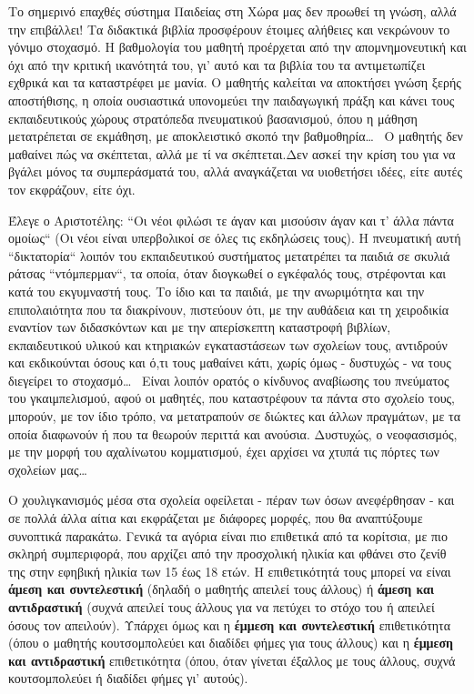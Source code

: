 \documentclass[12pt,a4paper,oneside]{book}
\begin{document}
\indent Το σημερινό επαχθές σύστημα Παιδείας στη Χώρα μας δεν προωθεί τη γνώση,
αλλά την επιβάλλει! Τα διδακτικά βιβλία προσφέρουν έτοιμες αλήθειες και
νεκρώνουν το γόνιμο στοχασμό. Η βαθμολογία του μαθητή προέρχεται από την
απομνημονευτική και όχι από την κριτική ικανότητά του, γι' αυτό και τα βιβλία
του τα αντιμετωπίζει εχθρικά και τα καταστρέφει με μανία. Ο μαθητής καλείται να
αποκτήσει γνώση ξερής αποστήθισης, η οποία ουσιαστικά υπονομεύει την παιδαγωγική
πράξη και κάνει τους εκπαιδευτικούς χώρους στρατόπεδα πνευματικού βασανισμού,
όπου η μάθηση μετατρέπεται σε εκμάθηση, με αποκλειστικό σκοπό την
βαθμοθηρία\ldots \,\,\, Ο μαθητής δεν μαθαίνει πώς να σκέπτεται, αλλά με τί
να σκέπτεται.\raggedbottom Δεν ασκεί την κρίση του για να βγάλει μόνος τα
συμπεράσματά του, αλλά αναγκάζεται να υιοθετήσει ιδέες, είτε αυτές τον εκφράζουν, είτε όχι.

\indent Έλεγε ο Αριστοτέλης: ``Οι νέοι φιλώσι τε άγαν και μισούσιν άγαν και τ'
άλλα πάντα ομοίως`` (Οι νέοι είναι υπερβολικοί σε όλες τις εκδηλώσεις τους). Η
πνευματική αυτή ``δικτατορία`` λοιπόν του εκπαιδευτικού συστήματος μετατρέπει τα
παιδιά σε σκυλιά ράτσας ``ντόμπερμαν``, τα οποία, όταν διογκωθεί ο εγκέφαλός
τους, στρέφονται και κατά του εκγυμναστή τους. Το ίδιο και τα παιδιά, με την
ανωριμότητα και την επιπολαιότητα που τα διακρίνουν, πιστεύουν ότι, με την
αυθάδεια και τη χειροδικία εναντίον των διδασκόντων και με την απερίσκεπτη
καταστροφή βιβλίων, εκπαιδευτικού υλικού και κτηριακών εγκαταστάσεων των
σχολείων τους, αντιδρούν και εκδικούνται όσους και ό,τι τους μαθαίνει κάτι,
χωρίς όμως - δυστυχώς - να τους διεγείρει το στοχασμό\ldots\,\,\, Είναι
λοιπόν ορατός ο κίνδυνος αναβίωσης του πνεύματος του γκαιμπελισμού, αφού οι
μαθητές, που καταστρέφουν τα πάντα στο σχολείο τους, μπορούν, με τον ίδιο τρόπο,
να μετατραπούν σε διώκτες και άλλων πραγμάτων,  με τα οποία διαφωνούν ή που τα
θεωρούν περιττά και ανούσια. Δυστυχώς, ο νεοφασισμός, με την μορφή του
αχαλίνωτου κομματισμού, έχει αρχίσει να χτυπά τις πόρτες των σχολείων μας\ldots

\indent Ο χουλιγκανισμός μέσα στα σχολεία οφείλεται - πέραν των όσων ανεφέρθησαν
- και σε πολλά άλλα αίτια και εκφράζεται με διάφορες μορφές, που θα αναπτύξουμε
συνοπτικά παρακάτω. Γενικά τα αγόρια είναι πιο επιθετικά από τα κορίτσια, με πιο
σκληρή συμπεριφορά, που αρχίζει από την προσχολική ηλικία και φθάνει στο ζενίθ
της στην εφηβική ηλικία των \num{15} έως \num{18} ετών. Η επιθετικότητά τους
μπορεί να είναι \textbf{άμεση και συντελεστική} (δηλαδή ο μαθητής απειλεί τους
άλλους) ή \textbf{άμεση και αντιδραστική} (συχνά απειλεί τους άλλους για να
πετύχει το στόχο του ή απειλεί όσους τον απειλούν). Υπάρχει όμως και η
\textbf{έμμεση και συντελεστική} επιθετικότητα (όπου ο μαθητής κουτσομπολεύει
και διαδίδει φήμες για τους άλλους) και η \textbf{έμμεση και αντιδραστική}
επιθετικότητα (όπου, όταν γίνεται έξαλλος με τους άλλους, συχνά κουτσομπολεύει ή
διαδίδει φήμες γι' αυτούς).
\end{document}
